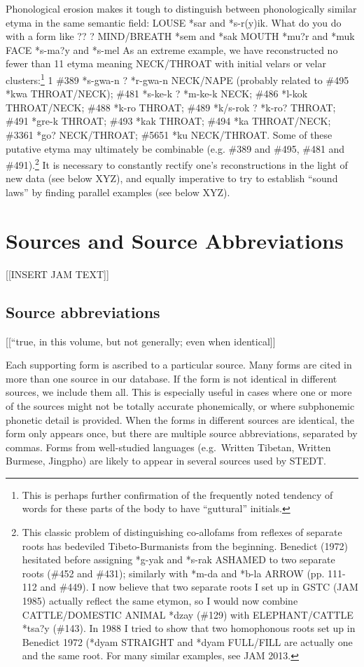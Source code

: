 Phonological erosion makes it tough to distinguish between phonologically similar etyma in the same semantic field:
		LOUSE *sar and *s-r(y)ik. What do you do with a form like ?? ?
		MIND/BREATH *sem and *sak
		MOUTH *mu?r and *muk
		FACE *s-ma?y and *s-mel
As an extreme example, we have reconstructed no fewer than 11 etyma meaning NECK/THROAT with initial velars or velar clusters:\footnote{This is perhaps further confirmation of the frequently noted tendency of words for these parts of the body to have “guttural” initials.} 1 \#389 *s-gwa-n ? *r-gwa-n NECK/NAPE (probably related to \#495 *kwa THROAT/NECK); \#481 *s-ke-k ? *m-ke-k NECK; \#486 *l-kok THROAT/NECK; \#488 *k-ro THROAT; \#489 *k/s-rok ? *k-ro? THROAT; \#491 *gre-k THROAT; \#493 *kak THROAT; \#494 *ka THROAT/NECK; \#3361 *go? NECK/THROAT; \#5651 *ku NECK/THROAT.
	Some of these putative etyma may ultimately be combinable (e.g. \#389 and \#495, \#481 and \#491).\footnote{ This classic problem of distinguishing co-allofams from reflexes of separate roots has bedeviled Tibeto-Burmanists from the beginning. Benedict (1972) hesitated before assigning *g-yak and *s-rak ASHAMED to two separate roots (\#452 and \#431); similarly with *m-da and *b-la ARROW (pp. 111-112 and \#449). I now believe that two separate roots I set up in GSTC (JAM 1985) actually reflect the same etymon, so I would now combine CATTLE/DOMESTIC ANIMAL *dzay (\#129) with ELEPHANT/CATTLE *tsa?y (\#143). In 1988 I tried to show that two homophonous roots set up in Benedict 1972 (*dyam STRAIGHT and *dyam FULL/FILL are actually one and the same root. For many similar examples, see JAM 2013.} It is necessary to constantly rectify one’s reconstructions in the light of new data (see below XYZ), and equally imperative to try to establish “sound laws” by finding parallel examples (see below XYZ).
	
	
	
\section{Sources and Source Abbreviations}

[[INSERT JAM TEXT]]

\subsection{Source abbreviations}

[[``true, in this volume, but not generally; even when identical]]

Each supporting form is ascribed to a particular source.  Many forms are
cited in more than one source in our database.  If the form is not identical in
different sources, we include them all.  This is especially useful in cases
where one or more of the sources might not be totally accurate phonemically, or
where subphonemic phonetic detail is provided. When the forms in different
sources are identical, the form only appears once, but there are multiple source
abbreviations, separated by commas.  Forms from well-studied languages
(e.g.\ Written Tibetan, Written Burmese, Jingpho) are likely to appear in several
sources used by STEDT.


